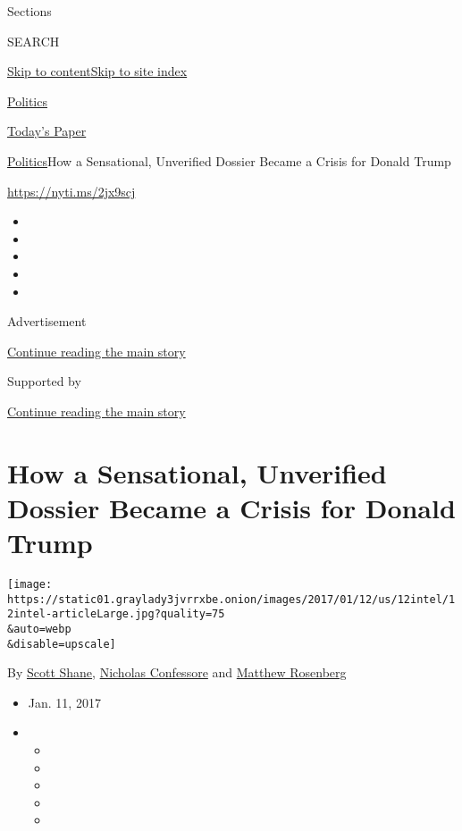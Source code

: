 Sections

SEARCH

\protect\hyperlink{site-content}{Skip to
content}\protect\hyperlink{site-index}{Skip to site index}

\href{https://www.nytimes3xbfgragh.onion/section/politics}{Politics}

\href{https://myaccount.nytimes3xbfgragh.onion/auth/login?response_type=cookie\&client_id=vi}{}

\href{https://www.nytimes3xbfgragh.onion/section/todayspaper}{Today's
Paper}

\href{/section/politics}{Politics}\textbar{}How a Sensational,
Unverified Dossier Became a Crisis for Donald Trump

\url{https://nyti.ms/2jx9scj}

\begin{itemize}
\item
\item
\item
\item
\item
\end{itemize}

Advertisement

\protect\hyperlink{after-top}{Continue reading the main story}

Supported by

\protect\hyperlink{after-sponsor}{Continue reading the main story}

\hypertarget{how-a-sensational-unverified-dossier-became-a-crisis-for-donald-trump}{%
\section{How a Sensational, Unverified Dossier Became a Crisis for
Donald
Trump}\label{how-a-sensational-unverified-dossier-became-a-crisis-for-donald-trump}}

\texttt{[image: https://static01.graylady3jvrrxbe.onion/images/2017/01/12/us/12intel/12intel-articleLarge.jpg?quality=75\\\&auto=webp\\\&disable=upscale]}

By \href{http://www.nytimes3xbfgragh.onion/by/scott-shane}{Scott Shane},
\href{http://www.nytimes3xbfgragh.onion/by/nicholas-confessore}{Nicholas
Confessore} and
\href{http://www.nytimes3xbfgragh.onion/by/matthew-rosenberg}{Matthew
Rosenberg}

\begin{itemize}
\item
  Jan. 11, 2017
\item
  \begin{itemize}
  \item
  \item
  \item
  \item
  \item
  \end{itemize}
\end{itemize}

